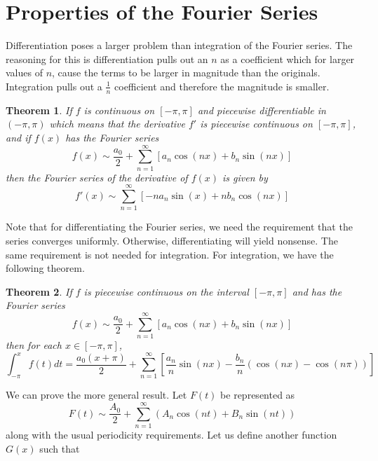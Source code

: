 \documentclass{report}
\newtheorem{theorem}{Theorem}[chapter]
\theoremstyle{definition}
\theoremstyle{remark}
\begin{document}
\section{Properties of the Fourier Series}
Differentiation poses a larger problem than integration of the Fourier series. The reasoning for this is differentiation pulls out an $n$ as a coefficient which for larger values of $n$, cause the terms to be larger in magnitude than the originals. Integration pulls out a $\frac{1}{n}$ coefficient and therefore the magnitude is smaller.
\begin{theorem}
    If $f$ is continuous on $[-\pi,\pi]$ and piecewise differentiable in $(-\pi,\pi)$ which means that the derivative $f'$ is piecewise continuous on $[-\pi,\pi]$, and if $f(x)$ has the Fourier series 
    \begin{equation*}
        f(x)\sim \frac{a_0}{2}+\sum^\infty_{n=1}[a_n\cos(nx)+b_n\sin(nx)]
    \end{equation*}
    then the Fourier series of the derivative of $f(x)$ is given by 
    \begin{equation*}
        f'(x)\sim \sum^\infty_{n=1}[-na_n\sin(x)+nb_n\cos(nx)]
    \end{equation*}
\end{theorem}
Note that for differentiating the Fourier series, we need the requirement that the series converges uniformly. Otherwise, differentiating will yield nonsense. The same requirement is not needed for integration. For integration, we have the following theorem.
\begin{theorem}
    If $f$ is piecewise continuous on the interval $[-\pi,\pi]$ and has the Fourier series 
    \begin{equation*}
        f(x)\sim \frac{a_0}{2}+\sum^\infty_{n=1}[a_n\cos(nx)+b_n\sin(nx)]
    \end{equation*}
    then for each $x\in [-\pi,\pi]$,
    \begin{equation*}
        \int^x_{-\pi}f(t)dt = \frac{a_0(x+\pi)}{2}+\sum^\infty_{n=1}\left[ \frac{a_n}{n}\sin (nx)-\frac{b_n}{n}(\cos(nx)-\cos(n\pi))\right]
    \end{equation*}
\end{theorem}
We can prove the more general result. Let $F(t)$ be represented as 
\begin{equation*}
    F(t)\sim \frac{A_0}{2}+\sum^\infty_{n=1}(A_n\cos (nt)+B_n \sin(nt))
\end{equation*}
along with the usual periodicity requirements. Let us define another function $G(x)$ such that 
\end{document}
